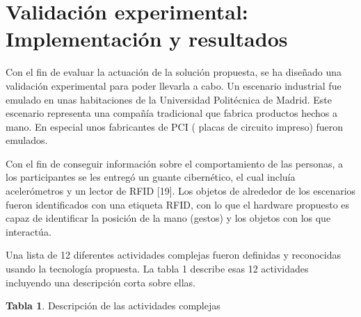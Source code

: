 \documentclass{article}
\begin{document}
\section{Validación experimental: Implementación y resultados}

Con el fin de evaluar la actuación de la solución propuesta, se ha diseñado una validación experimental para poder llevarla a cabo. Un escenario industrial fue emulado en unas habitaciones de la Universidad Politécnica de Madrid. Este escenario representa una compañía tradicional que fabrica productos hechos a mano. En especial unos fabricantes de PCI ( placas de circuito impreso) fueron emulados.

Con el fin de conseguir información sobre el comportamiento de las personas, a los participantes se les entregó un guante cibernético, el cual incluía acelerómetros y un lector de RFID [19]. Los objetos de alrededor de los escenarios fueron identificados con una etiqueta RFID, con lo que el hardware propuesto es capaz de identificar la posición de la mano (gestos) y los objetos con los que interactúa.

Una lista de 12 diferentes actividades complejas fueron definidas y reconocidas usando la tecnología propuesta. La tabla 1 describe esas 12 actividades incluyendo una descripción corta sobre ellas.

\begin{center}
\textbf{Tabla 1}. Descripción de las actividades complejas
\end{center}
\end{document}
